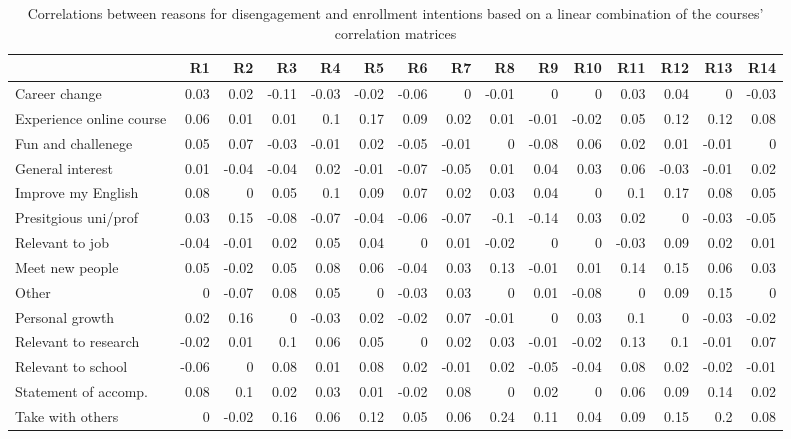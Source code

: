 \documentclass{sigchi}\usepackage[]{graphicx}\usepackage[]{color}
\begin{document}
\begin{table}
\label{tab:study1_rfd_ei_corr}
\caption{Correlations between reasons for disengagement and enrollment intentions based on a linear combination of the courses' correlation matrices}
\small
\center
\begin{tabular}{lrrrrrrrrrrrrrr}
\toprule
 & R1 & R2 & R3 & R4 & R5 & R6 & R7 & R8 & R9 & R10 & R11 & R12 & R13 & R14 \\
\midrule
Career change & 0.03 & 0.02 & -0.11 & -0.03 & -0.02 & -0.06 & 0 & -0.01 & 0 & 0 & 0.03 & 0.04 & 0 & -0.03 \\
Experience online course & 0.06 & 0.01 & 0.01 & 0.1 & 0.17 & 0.09 & 0.02 & 0.01 & -0.01 & -0.02 & 0.05 & 0.12 & 0.12 & 0.08 \\
Fun and challenege & 0.05 & 0.07 & -0.03 & -0.01 & 0.02 & -0.05 & -0.01 & 0 & -0.08 & 0.06 & 0.02 & 0.01 & -0.01 & 0 \\
General interest & 0.01 & -0.04 & -0.04 & 0.02 & -0.01 & -0.07 & -0.05 & 0.01 & 0.04 & 0.03 & 0.06 & -0.03 & -0.01 & 0.02 \\
Improve my English & 0.08 & 0 & 0.05 & 0.1 & 0.09 & 0.07 & 0.02 & 0.03 & 0.04 & 0 & 0.1 & 0.17 & 0.08 & 0.05 \\
Presitgious uni/prof & 0.03 & 0.15 & -0.08 & -0.07 & -0.04 & -0.06 & -0.07 & -0.1 & -0.14 & 0.03 & 0.02 & 0 & -0.03 & -0.05 \\
Relevant to job & -0.04 & -0.01 & 0.02 & 0.05 & 0.04 & 0 & 0.01 & -0.02 & 0 & 0 & -0.03 & 0.09 & 0.02 & 0.01 \\
Meet new people & 0.05 & -0.02 & 0.05 & 0.08 & 0.06 & -0.04 & 0.03 & 0.13 & -0.01 & 0.01 & 0.14 & 0.15 & 0.06 & 0.03 \\
Other & 0 & -0.07 & 0.08 & 0.05 & 0 & -0.03 & 0.03 & 0 & 0.01 & -0.08 & 0 & 0.09 & 0.15 & 0 \\
Personal growth & 0.02 & 0.16 & 0 & -0.03 & 0.02 & -0.02 & 0.07 & -0.01 & 0 & 0.03 & 0.1 & 0 & -0.03 & -0.02 \\
Relevant to research & -0.02 & 0.01 & 0.1 & 0.06 & 0.05 & 0 & 0.02 & 0.03 & -0.01 & -0.02 & 0.13 & 0.1 & -0.01 & 0.07 \\
Relevant to school & -0.06 & 0 & 0.08 & 0.01 & 0.08 & 0.02 & -0.01 & 0.02 & -0.05 & -0.04 & 0.08 & 0.02 & -0.02 & -0.01 \\
Statement of accomp. & 0.08 & 0.1 & 0.02 & 0.03 & 0.01 & -0.02 & 0.08 & 0 & 0.02 & 0 & 0.06 & 0.09 & 0.14 & 0.02 \\
Take with others & 0 & -0.02 & 0.16 & 0.06 & 0.12 & 0.05 & 0.06 & 0.24 & 0.11 & 0.04 & 0.09 & 0.15 & 0.2 & 0.08 \\
\bottomrule
\end{tabular}
\end{table}
\end{document}
